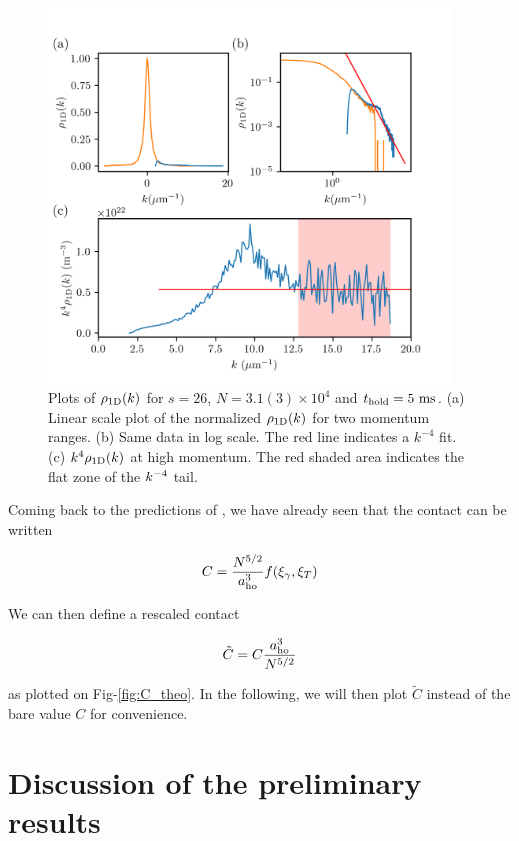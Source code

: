\begin{figure}
    \centering
    \includegraphics[width=0.95\textwidth]{Fig/Chapter5/1D_plots.png}
    \caption{Plots of $\rho_{\rm{1D}}(k)$ for $s=26$, $N=3.1(3) \times 10^4$ and $t_{\rm{hold}}=5 \ \rm{ms}$. (a) Linear scale plot of the normalized $\rho_{\rm{1D}}(k)$ for two momentum ranges. (b) Same data in log scale. The red line indicates a $k^{-4}$ fit. (c) $k^4 \rho_{\rm{1D}} (k)$ at high momentum. The red shaded area indicates the flat zone of the $k^{-4}$ tail.}
    \label{fig:1D_plots}
\end{figure}

Coming back to the predictions of \cite{yao2018tan}, we have already seen that the contact can be written

\begin{equation}
    C= \frac{N^{5/2}}{a_{\rm{ho}}^3} f(\xi_{\gamma},\xi_{T})
\end{equation}

\noindent We can then define a rescaled contact

\begin{equation}
    \tilde{C}=C \frac{a_{\rm{ho}}^3}{N^{5/2}}
\end{equation}

as plotted on Fig-\ref{fig:C_theo}. In the following, we will then plot $\tilde{C}$ instead of the bare value $C$ for convenience.


\section{Discussion of the preliminary results}

